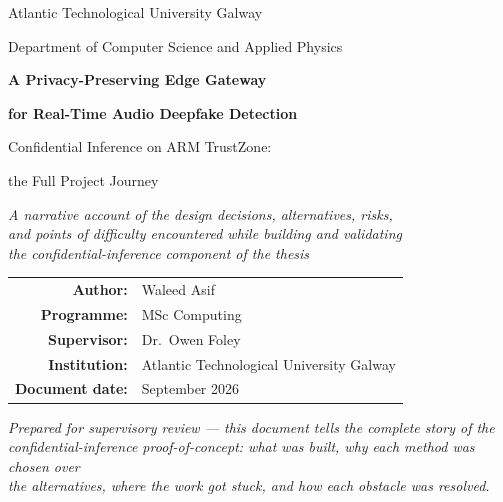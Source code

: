 \documentclass[11pt,a4paper]{report}
\begin{document}
\begin{titlepage}
\centering
\vspace*{1.2cm}
{\large Atlantic Technological University Galway\par}
{\large Department of Computer Science and Applied Physics\par}
\vspace{1.6cm}
{\color{navy}\Huge\bfseries A Privacy-Preserving Edge Gateway\par}
\vspace{0.3cm}
{\color{navy}\Huge\bfseries for Real-Time Audio Deepfake Detection\par}
\vspace{0.8cm}
{\LARGE Confidential Inference on ARM TrustZone: \par}
{\LARGE the Full Project Journey\par}
\vspace{1.6cm}
{\large\itshape A narrative account of the design decisions, alternatives, risks,\\
and points of difficulty encountered while building and validating\\
the confidential-inference component of the thesis\par}
\vspace{2.2cm}

\begin{tabular}{rl}
\textbf{Author:} & Waleed Asif \\[3pt]
\textbf{Programme:} & MSc Computing \\[3pt]
\textbf{Supervisor:} & Dr.\ Owen Foley \\[3pt]
\textbf{Institution:} & Atlantic Technological University Galway \\[3pt]
\textbf{Document date:} & September 2026 \\
\end{tabular}

\vfill
{\small\itshape Prepared for supervisory review --- this document tells the complete story of the\\
confidential-inference proof-of-concept: what was built, why each method was chosen over\\
the alternatives, where the work got stuck, and how each obstacle was resolved.\par}
\vspace{0.5cm}
\end{titlepage}

\tableofcontents
\clearpage
\end{document}
